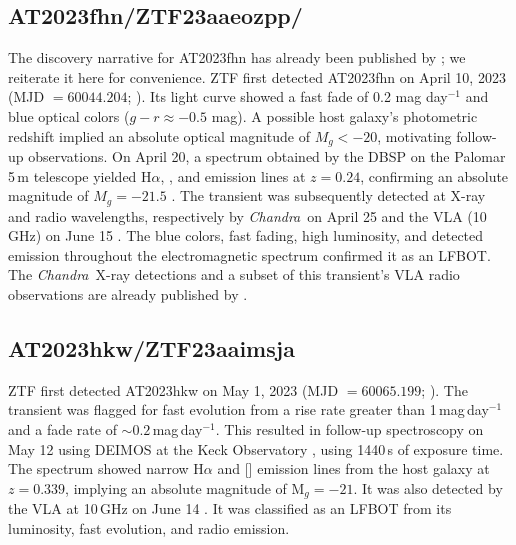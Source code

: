 \documentclass[twocolumn,twocolappendix, linenumbers, trackchanges]{aastex7}
\newcommand{\chandra}{\emph{Chandra}}
\begin{document}
\subsection{AT2023fhn/ZTF23aaeozpp/}
The discovery narrative for AT2023fhn has already been published by \citet{chrimesfhn}; we reiterate it here for convenience.  ZTF first detected AT2023fhn on April 10, 2023 (MJD $=60044.204$; \citealt{astro2023fhn_disc}).  Its light curve showed a fast fade of 0.2 mag day$^{-1}$ and blue optical colors ($g-r \approx -0.5$ mag).  A possible host galaxy's photometric redshift implied an absolute optical magnitude of $M_g <-20$, motivating follow-up observations.  On April 20, a spectrum obtained by the DBSP on the Palomar 5\,m %
telescope yielded H$\alpha$, , and  emission lines at $z=0.24$, confirming an absolute magnitude of $M_g=-21.5$ \citep{astro2023fhn_p200}.  The transient was subsequently detected at X-ray and radio wavelengths, respectively by \chandra\ on April 25 \citep{astro2023fhn_chandra} and the VLA (10 GHz) on June 15 \citep{astro2023fhn_vla}.  The blue colors, fast fading, high luminosity, and detected emission throughout the electromagnetic spectrum confirmed it as an LFBOT.  The \chandra\ X-ray detections and a subset of this transient's VLA radio observations are already published by \citet{chrimes2024}.


\subsection{AT2023hkw/ZTF23aaimsja}
ZTF first detected AT2023hkw on May 1, 2023 (MJD $=60065.199$; \citealt{astro2023hkw_disc}).  The transient was flagged for fast evolution from a rise rate greater than 1\,mag\,day$^{-1}$ and a fade rate of $\sim 0.2$\,mag\,day$^{-1}$.  This resulted in follow-up spectroscopy on May 12 using DEIMOS at the Keck Observatory %
\citep{astro2023hkw_keck}, using 1440\,s of exposure time.  The spectrum showed narrow H$\alpha$ and [] emission lines from the host galaxy at $z=0.339$, implying an absolute magnitude of $\mathrm{M}_g=-21$.  It was also detected by the VLA at 10\,GHz on June 14 \citep{astro2023hkw_vla}.  It was classified as an LFBOT from its luminosity, fast evolution, and radio emission.
\end{document}
